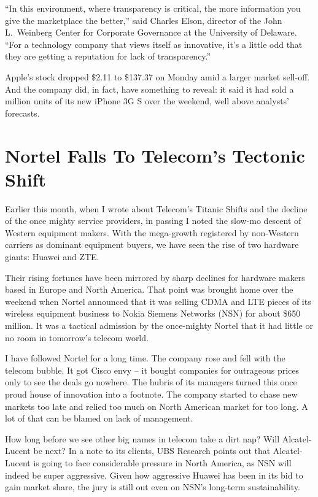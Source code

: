 ﻿\documentclass[12pt,a4paper,onecolumn]{article}
\begin{document}
``In this environment, where transparency is critical, the more information you give the marketplace
the better,'' said Charles Elson, director of the John L.~Weinberg Center for Corporate Governance
at the University of Delaware. ``For a technology company that views itself as innovative, it's a
little odd that they are getting a reputation for lack of transparency.''

Apple's stock dropped \$2.11 to \$137.37 on Monday amid a larger market sell-off. And the company
did, in fact, have something to reveal: it said it had sold a million units of its new iPhone 3G S
over the weekend, well above analysts' forecasts.

\section{Nortel Falls To Telecom's Tectonic Shift}

Earlier this month, when I wrote about Telecom's Titanic Shifts and the decline of the once mighty
service providers, in passing I noted the slow-mo descent of Western equipment makers. With the
mega-growth registered by non-Western carriers as dominant equipment buyers, we have seen the rise
of two hardware giants: Huawei and ZTE.

Their rising fortunes have been mirrored by sharp declines for hardware makers based in Europe and
North America. That point was brought home over the weekend when Nortel announced that it was
selling CDMA and LTE pieces of its wireless equipment business to Nokia Siemens Networks (NSN) for
about \$650 million. It was a tactical admission by the once-mighty Nortel that it had little or no
room in tomorrow's telecom world.

I have followed Nortel for a long time. The company rose and fell with the telecom bubble. It got
Cisco envy -- it bought companies for outrageous prices only to see the deals go nowhere. The hubris
of its managers turned this once proud house of innovation into a footnote. The company started to
chase new markets too late and relied too much on North American market for too long. A lot of that
can be blamed on lack of management.

How long before we see other big names in telecom take a dirt nap? Will Alcatel-Lucent be next? In a
note to its clients, UBS Research points out that Alcatel-Lucent is going to face considerable
pressure in North America, as NSN will indeed be super aggressive. Given how aggressive Huawei has
been in its bid to gain market share, the jury is still out even on NSN's long-term sustainability.
\end{document}
